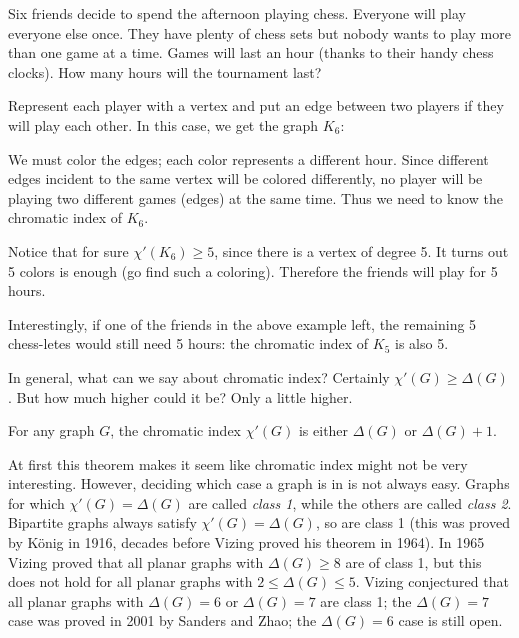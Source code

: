\documentclass[12pt]{article}
\begin{document}
\begin{example}
Six friends decide to spend the afternoon playing chess.  Everyone will play everyone else once.  They have plenty of chess sets but nobody wants to play more than one game at a time.  Games will last an hour (thanks to their handy chess clocks).  How many hours will the tournament last?

\begin{solution}
Represent each player with a vertex and put an edge between two players if they will play each other.  In this case, we get the graph $K_6$:

\begin{center}
\end{center}

We must color the edges; each color represents a different hour.  Since different edges incident to the same vertex will be colored differently, no player will be playing two different games (edges) at the same time.  Thus we need to know the chromatic index of $K_6$.

Notice that for sure $\chi'(K_6) \ge 5$, since there is a vertex of degree 5. It turns out 5 colors is enough (go find such a coloring).  Therefore the friends will play for 5 hours.
\end{solution}
\end{example}

Interestingly, if one of the friends in the above example left, the remaining 5 chess-letes would still need 5 hours: the chromatic index of $K_5$ is also 5.

In general, what can we say about chromatic index?  Certainly $\chi'(G) \ge \Delta(G)$.  But how much higher could it be?  Only a little higher.

\begin{theorem}
For any graph $G$, the chromatic index $\chi'(G)$ is either $\Delta(G)$ or $\Delta(G) + 1$.
\end{theorem}

At first this theorem makes it seem like chromatic index might not be very interesting.  However, deciding which case a graph is in is not always easy.  Graphs for which $\chi'(G) = \Delta(G)$ are called \emph{class 1}, while the others are called \emph{class 2}. Bipartite graphs always satisfy $\chi'(G) = \Delta(G)$, so are class 1 (this was proved by K\"onig in 1916, decades before Vizing proved his theorem in 1964).  In 1965 Vizing proved that all planar graphs with $\Delta(G) \ge 8$ are of class 1, but this does not hold for all planar graphs with $2 \le \Delta(G) \le 5$.  Vizing conjectured that all planar graphs with $\Delta(G) = 6$ or $\Delta(G) = 7$ are class 1; the $\Delta(G) = 7$ case was proved in 2001 by Sanders and Zhao; the $\Delta(G) = 6$ case is still open.
\end{document}
